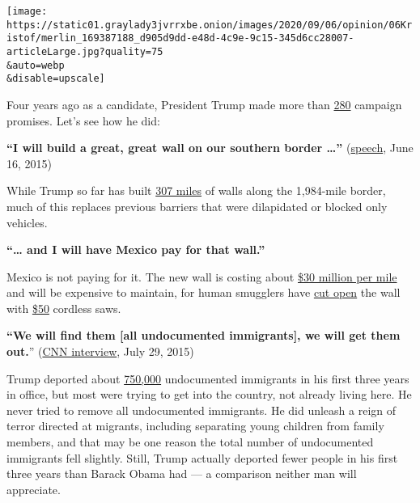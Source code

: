 \texttt{[image: https://static01.graylady3jvrrxbe.onion/images/2020/09/06/opinion/06Kristof/merlin\_169387188\_d905d9dd-e48d-4c9e-9c15-345d6cc28007-articleLarge.jpg?quality=75\\\&auto=webp\\\&disable=upscale]}

Four years ago as a candidate, President Trump made more than
\href{https://www.washingtonpost.com/politics/i-will-give-you-everything-here-are-282-of-donald-trumps-campaign-promises/2016/11/24/01160678-b0f9-11e6-8616-52b15787add0_story.html}{280}
campaign promises. Let's see how he did:

\textbf{``I will build a great, great wall on our southern border
\ldots{}''}
(\href{https://www.c-span.org/video/?326473-1/donald-trump-presidential-campaign-announcement}{speech},
June 16, 2015)

While Trump so far has built
\href{https://www.cbp.gov/border-security/along-us-borders/border-wall-system}{307
miles} of walls along the 1,984-mile border, much of this replaces
previous barriers that were dilapidated or blocked only vehicles.

\textbf{``\ldots{} and I will have Mexico pay for that wall.''}

Mexico is not paying for it. The new wall is costing about
\href{https://www.newsweek.com/trumps-new-border-wall-contract-will-cost-more-30-million-per-mile-1505341}{\$30
million per mile} and will be expensive to maintain, for human smugglers
have
\href{https://www.washingtonpost.com/national/smugglers-are-sawing-through-new-sections-of-trumps-border-wall/2019/11/01/25bf8ce0-fa72-11e9-ac8c-8eced29ca6ef_story.html}{cut
open} the wall with
\href{https://www.amazon.com/BLACK-DECKER-BDCR20B-Lithium-Reciprocating/dp/B00IP27DFA/ref=sr_1_6?dchild=1\&keywords=cordless+reciprocal+saw\&qid=1599240867\&sr=8-6}{\$50}
cordless saws.

\textbf{``We will find them {[}all undocumented immigrants{]}, we will
get them out.}''
(\href{https://www.cnn.com/2015/07/29/politics/donald-trump-immigration-plan-healthcare-flip-flop/?_ga=2.181094831.904733953.1599155350-1137478116.1599155350}{CNN
interview}, July 29, 2015)

Trump deported about
\href{https://www.politifact.com/truth-o-meter/promises/trumpometer/promise/1399/remove-all-undocumented-immigrants/}{750,000}
undocumented immigrants in his first three years in office, but most
were trying to get into the country, not already living here. He never
tried to remove all undocumented immigrants. He did unleash a reign of
terror directed at migrants, including separating young children from
family members, and that may be one reason the total number of
undocumented immigrants fell slightly. Still, Trump actually deported
fewer people in his first three years than Barack Obama had --- a
comparison neither man will appreciate.

